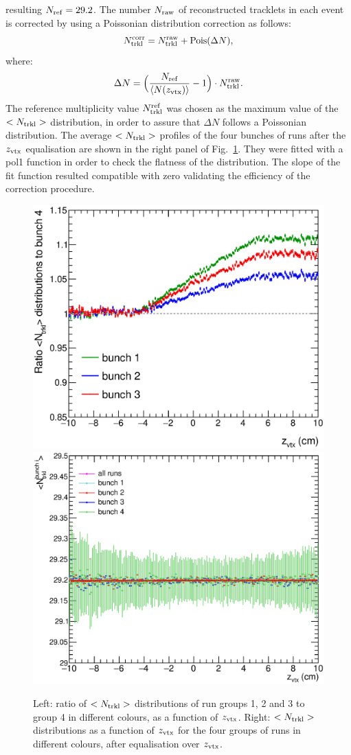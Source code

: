 resulting $N_{\rm ref} =  29.2$. 
The number $N_{\rm raw}$ of reconstructed tracklets in each event
is corrected by using a Poissonian distribution correction as follows:
\begin{equation} 
\label{eq:NtrklCorr}
N_{\rm trkl}^{\rm corr} = N_{\rm trkl}^{\rm raw} + {\rm Pois}(\Delta N),
\end{equation}
where:
\begin{equation} 
\label{eq:NtrklCorr}
\Delta N = \Big (\frac{N_{\rm ref}}{\langle N(z_{\rm vtx}) \rangle} -1 \Big ) \cdot N_{\rm trkl}^{\rm raw}.
\end{equation}
 The reference multiplicity value $N_{\rm trkl}^{\rm ref}$ was chosen as the
 maximum value of the $<N_{\rm trkl}>$ distribution, in order to assure
 that $\Delta N$ follows a Poissonian distribution. 
The average $<N_{\rm trkl}>$ profiles of the four bunches of runs 
after the $z_{\rm vtx}$ equalisation are shown in the right panel of 
Fig.~\ref{fig:FourBunches}. They were fitted with a pol1 function in order
to check the flatness of the distribution. The slope of the fit function resulted compatible with zero
validating the efficiency of the correction procedure.

\begin{figure}[h]
\centering
 \includegraphics[width=.49\textwidth]{FigCap6/UncorrNtrklProfileDataRatio.eps}
 \includegraphics[width=.49\textwidth]{FigCap6/NtrkProfilesDataAfterZVxtEqual.eps}
 \caption{Left: ratio of $<N_{\rm trkl}>$ distributions of run groups 1, 2 and 3 to group 4 in different colours, as a function of $z_{\rm vtx}$. Right: $<N_{\rm trkl}>$ distributions as a function of $z_{\rm vtx}$ for the four groups of runs in different colours, after equalisation over $z_{\rm vtx}$.}
 \label{fig:FourBunches}
\end{figure}

